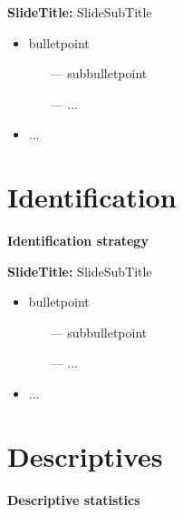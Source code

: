 \documentclass{beamer} %
\begin{document}
\begin{frame}{\textbf{SlideTitle:} SlideSubTitle}
	\begin{itemize}
	    \item bulletpoint
    	\begin{itemize}
    	    \item[---] subbulletpoint
    	    \item[---] ...
    	\end{itemize}
    	\item ...
	\end{itemize}
\end{frame}

\section{Identification}
{
	\begin{frame}[plain]		
		\vspace{1cm}
		{\color{white}\LARGE \textbf{Identification strategy}}
	\end{frame}
}

\begin{frame}{\textbf{SlideTitle:} SlideSubTitle}
	\begin{itemize}
	    \item bulletpoint
    	\begin{itemize}
    	    \item[---] subbulletpoint
    	    \item[---] ...
    	\end{itemize}
    	\item ...
	\end{itemize}
\end{frame}

\section{Descriptives}
{
	\begin{frame}[plain]		
	\vspace{1cm}
	{\color{white}\LARGE \textbf{Descriptive statistics}}
\end{frame}
}
\end{document}
